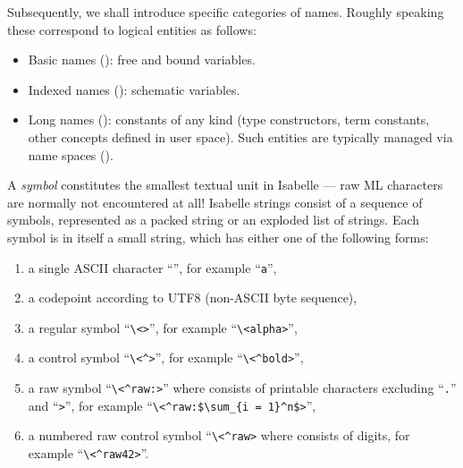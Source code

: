 \begin{isabellebody}
\begin{isamarkuptext}
  \medskip Subsequently, we shall introduce specific categories of
  names.  Roughly speaking these correspond to logical entities as
  follows:
  \begin{itemize}

  \item Basic names (): free and bound
  variables.

  \item Indexed names (): schematic variables.

  \item Long names (): constants of any kind
  (type constructors, term constants, other concepts defined in user
  space).  Such entities are typically managed via name spaces
  ().

  \end{itemize}%
\end{isamarkuptext}%
\isamarkuptrue%
%
\isamarkuptrue%
%
\begin{isamarkuptext}%
A \emph{symbol} constitutes the smallest textual unit in
  Isabelle --- raw ML characters are normally not encountered at all!
  Isabelle strings consist of a sequence of symbols, represented as a
  packed string or an exploded list of strings.  Each symbol is in
  itself a small string, which has either one of the following forms:

  \begin{enumerate}

  \item a single ASCII character ``'', for example
  ``\verb,a,'',

  \item a codepoint according to UTF8 (non-ASCII byte sequence),

  \item a regular symbol ``\verb,\,\verb,<,\verb,>,'',
  for example ``\verb,\,\verb,<alpha>,'',

  \item a control symbol ``\verb,\,\verb,<^,\verb,>,'',
  for example ``\verb,\,\verb,<^bold>,'',

  \item a raw symbol ``\verb,\,\verb,<^raw:,\verb,>,''
  where  consists of printable characters excluding
  ``\verb,.,'' and ``\verb,>,'', for example
  ``\verb,\,\verb,<^raw:$\sum_{i = 1}^n$>,'',

  \item a numbered raw control symbol ``\verb,\,\verb,<^raw,\verb,>, where  consists of digits, for example
  ``\verb,\,\verb,<^raw42>,''.


\end{enumerate}
\end{isamarkuptext}
\end{isabellebody}
